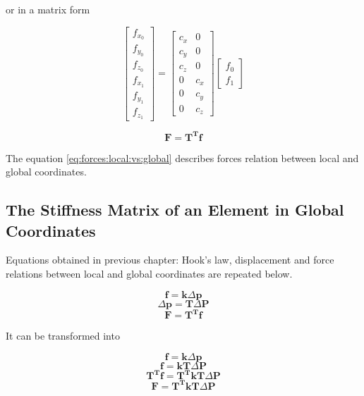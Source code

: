 or in a matrix form

\begin{equation}
\begin{bmatrix}
	f_{x_0} \\
	f_{y_0} \\
	f_{z_0} \\
	f_{x_1} \\
	f_{y_1} \\
	f_{z_1}
\end{bmatrix}
=
\begin{bmatrix}
	c_x & 0 \\
	c_y & 0 \\
	c_z & 0 \\
	0 & c_x \\
	0 & c_y \\
	0 & c_z
\end{bmatrix}
\begin{bmatrix}
	f_0 \\
	f_1
\end{bmatrix}
\end{equation}

\begin{equation}
\mathbf{F = T^T f}
\label{eq:forces:local:vs:global}
\end{equation}

The equation \ref{eq:forces:local:vs:global} describes forces relation between local and global coordinates.

\subsection{The Stiffness Matrix of an Element in Global Coordinates}

Equations obtained in previous chapter: Hook's law, displacement and force relations between local and global coordinates are repeated below.

\begin{equation}
\mathbf{f} = \mathbf{k} \Delta \mathbf{p}
\end{equation}
\begin{equation}
\Delta \mathbf{p} = \mathbf{T} \Delta \mathbf{P}
\end{equation}
\begin{equation}
\mathbf{F = T^T f}
\end{equation}

It can be transformed into

\begin{equation}
\mathbf{f} = \mathbf{k} \Delta \mathbf{p}
\end{equation}
\begin{equation}
\mathbf{f} = \mathbf{k T} \Delta \mathbf{P}
\end{equation}
\begin{equation}
\mathbf{T^T f} = \mathbf{T^T k T} \Delta \mathbf{P}
\end{equation}
\begin{equation}
\mathbf{F} = \mathbf{T^T k T} \Delta \mathbf{P}
\end{equation}

